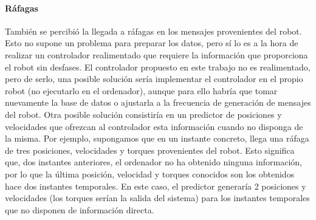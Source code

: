 \paragraph{Ráfagas}
También se percibió la llegada a ráfagas en los mensajes provenientes del robot. Esto no supone un problema para preparar los datos, pero sí lo es a la hora de realizar un controlador realimentado que requiere la información que proporciona el robot sin desfases. El controlador propuesto en este trabajo no es realimentado, pero de serlo, una posible solución sería implementar el controlador en el propio robot (no ejecutarlo en el ordenador), aunque para ello habría que tomar nuevamente la base de datos o ajustarla a la frecuencia de generación de mensajes del robot. Otra posible solución consistiría en un predictor de posiciones y velocidades que ofrezcan al controlador esta información cuando no disponga de la misma. Por ejemplo, supongamos que en un instante concreto, llega una ráfaga de tres posiciones, velocidades y torques provenientes del robot. Esto significa que, dos instantes anteriores, el ordenador no ha obtenido ninguna información, por lo que la última posición, velocidad y torques conocidos son los obtenidos hace dos instantes temporales. En este caso, el predictor generaría 2 posiciones y velocidades (los torques serían la salida del sistema) para los instantes temporales que no disponen de información directa.


